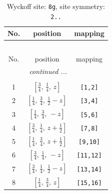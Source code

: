 \documentclass[fleqn,8pt]{jsarticle}
\begin{document}
\begin{longtable}{ccc}
\caption{Wyckoff site: {\tt 8g}, site symmetry: {\tt 2..}}
 \\
 \hline \hline
No. & position & mapping \\ \hline \endfirsthead

\multicolumn{2}{l}{\tablename\ \thetable{}} \\
 \hline \hline
No. & position & mapping \\ \hline \endhead

 \hline \hline
\multicolumn{2}{r}{\footnotesize\it continued ...} \\ \endfoot

 \hline \hline
\multicolumn{2}{r}{} \\ \endlastfoot

1 & $\left[ \frac{3}{4},\, \frac{1}{4},\, z \right]$ & {\tt [1,2]} \\ \hline
2 & $\left[ \frac{1}{4},\, \frac{3}{4},\, \frac{1}{2} - z \right]$ & {\tt [3,4]} \\ \hline
3 & $\left[ \frac{1}{4},\, \frac{3}{4},\, - z \right]$ & {\tt [5,6]} \\ \hline
4 & $\left[ \frac{3}{4},\, \frac{1}{4},\, z + \frac{1}{2} \right]$ & {\tt [7,8]} \\ \hline
5 & $\left[ \frac{1}{4},\, \frac{3}{4},\, z + \frac{1}{2} \right]$ & {\tt [9,10]} \\ \hline
6 & $\left[ \frac{3}{4},\, \frac{1}{4},\, - z \right]$ & {\tt [11,12]} \\ \hline
7 & $\left[ \frac{3}{4},\, \frac{1}{4},\, \frac{1}{2} - z \right]$ & {\tt [13,14]} \\ \hline
8 & $\left[ \frac{1}{4},\, \frac{3}{4},\, z \right]$ & {\tt [15,16]} \\
\end{longtable}
\renewcommand{\arraystretch}{1.2}
\end{document}
